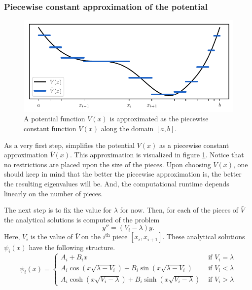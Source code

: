 \subsubsection{Piecewise constant approximation of the potential}

\begin{figure}
    \begin{center}
        \includegraphics[width=\textwidth]{img/chapter2/cpm_constant_approx.pdf}
        \caption{A potential function $V(x)$ is approximated as the piecewise constant function $\bar{V}(x)$ along the domain $[a, b]$.}
        \label{fig:c2_cpm_constant_approx}
    \end{center}
\end{figure}

As a very first step, \cite{canosa_new_1970} simplifies the potential $V(x)$ as a piecewise constant approximation $\bar{V}(x)$. This approximation is visualized in figure \ref{fig:c2_cpm_constant_approx}. Notice that no restrictions are placed upon the size of the pieces. Upon choosing $\bar{V}(x)$, one should keep in mind that the better the piecewise approximation is, the better the resulting eigenvalues will be. And, the computational runtime depends linearly on the number of pieces.

The next step is to fix the value for $\lambda$ for now. Then, for each of the pieces of $\bar{V}$ the analytical solutions is computed of the problem
$$
    y'' = (V_i - \lambda) y\text{.}
$$
Here, $V_i$ is the value of $\bar{V}$ on the $i^\text{th}$ piece $[x_i, x_{i+1}]$. These analytical solutions $\psi_i(x)$ have the following structure.
$$
    \psi_i(x) = \begin{cases}
        A_i + B_i x                                                         & \text{ if $V_i = \lambda$} \\
        A_i \cos(x\sqrt{\lambda - V_i}) + B_i \sin(x\sqrt{\lambda - V_i})   & \text{ if $V_i < \lambda$} \\
        A_i \cosh(x\sqrt{V_i - \lambda}) + B_i \sinh(x\sqrt{V_i - \lambda}) & \text{ if $V_i > \lambda$}
    \end{cases}
$$

